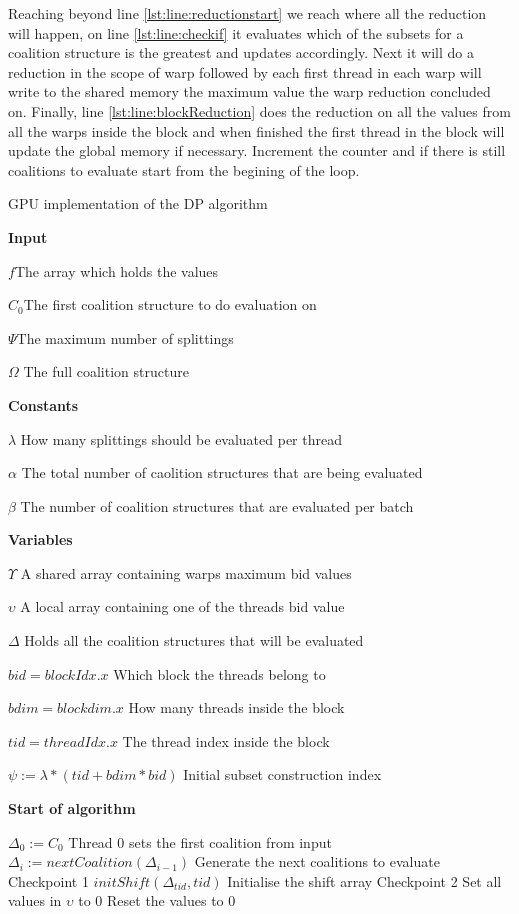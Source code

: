 \documentclass{llncs}
\begin{document}
Reaching beyond line \ref{lst:line:reductionstart} we reach where all the reduction will happen, 
on line \ref{lst:line:checkif} it evaluates which of the subsets for a coalition structure is the greatest and updates accordingly.
Next it will do a reduction in the scope of warp followed by each first thread in each warp will write to the shared memory 
the maximum value the warp reduction concluded on. Finally, line \ref{lst:line:blockReduction} does the reduction on all the values
from all the warps inside the block and when finished the first thread in the block will update the global memory if necessary.
Increment the counter and if there is still coalitions to evaluate start from the begining of the loop.
\begin{algorithm}
\caption{GPU implementation of the DP algorithm\label{gpudp}}
\textbf{Input}

$f$\hfill The array which holds the values

$C_0$\hfill The first coalition structure to do evaluation on

$\Psi$\hfill The maximum number of splittings

$\Omega$ \hfill The full coalition structure

\textbf{Constants}

$\lambda$ \hfill How many splittings should be evaluated per thread

$\alpha$ \hfill The total number of caolition structures that are being evaluated

$\beta$ \hfill The number of coalition structures that are evaluated per batch

\textbf{Variables} 

$\Upsilon$ \hfill A shared array containing warps maximum bid values

$\upsilon$ \hfill A local array containing one of the threads bid value

$\Delta$ \hfill Holds all the coalition structures that will be evaluated

$bid = blockIdx.x$ \hfill Which block the threads belong to



$bdim = blockdim.x$ \hfill How many threads inside the block

$tid = threadIdx.x$ \hfill The thread index inside the block

$\psi := \lambda*(tid+bdim*bid)$ \hfill Initial subset construction index

\textbf{Start of algorithm}
\begin{algorithmic}[1]
  \STATE $\Delta_0 := C_0$ \hfill Thread 0 sets the first coalition from input
    \STATE $\Delta_i := nextCoalition(\Delta_{i-1})$ \hfill Generate the next coalitions to evaluate
  \ENDFOR \hfill Checkpoint 1
\ENDIF
{}
  \STATE $initShift(\Delta_{tid},tid)$ \hfill Initialise the shift array
\ENDIF
\hfill Checkpoint 2
\label{lst:line:bigfetch}
  \STATE Set all values in $\upsilon$ to 0 \hfill Reset the values to 0


\end{algorithmic}
\end{algorithm}
\end{document}
